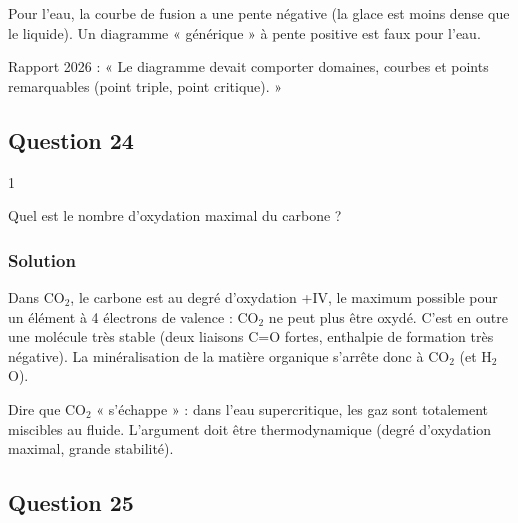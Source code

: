 \documentclass[11pt,a4paper]{article}
\begin{document}
\begin{piege}

Pour l'eau, la courbe de fusion a une pente négative (la glace est moins dense que le liquide). Un diagramme « générique » à pente positive est faux pour l'eau.

\end{piege}

\begin{jury}

Rapport 2026 : « Le diagramme devait comporter domaines, courbes et points remarquables (point triple, point critique). »

\end{jury}

\hypertarget{question-24}{%
\subsection{Question 24}\label{question-24}}

\begin{indication}{1}

Quel est le nombre d'oxydation maximal du carbone ?

\end{indication}

\hypertarget{solution-23}{%
\subsubsection{Solution}\label{solution-23}}

Dans CO\(_2\), le carbone est au degré d'oxydation +IV, le maximum possible pour un élément à 4 électrons de valence : CO\(_2\) ne peut plus être oxydé. C'est en outre une molécule très stable (deux liaisons C=O fortes, enthalpie de formation très négative). La minéralisation de la matière organique s'arrête donc à CO\(_2\) (et H\(_2\)O).

\begin{piege}

Dire que CO\(_2\) « s'échappe » : dans l'eau supercritique, les gaz sont totalement miscibles au fluide. L'argument doit être thermodynamique (degré d'oxydation maximal, grande stabilité).

\end{piege}

\hypertarget{question-25}{%
\subsection{Question 25}\label{question-25}}
\end{document}
